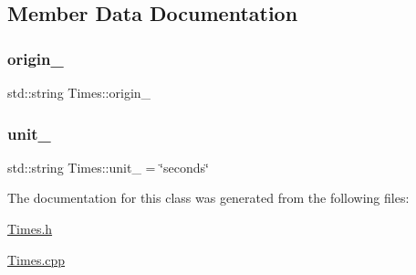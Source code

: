 \subsection{Member Data Documentation}
\mbox{\label{class_times_a7609195d9216105cad01df13230abfa9}} 
\subsubsection{\texorpdfstring{origin\+\_\+}{origin\_}}
{\footnotesize\ttfamily std\+::string Times\+::origin\+\_\+\hspace{0.3cm}{\ttfamily [protected]}}

\mbox{\label{class_times_a32130156e076d5511c44fc71ee68a980}} 
\subsubsection{\texorpdfstring{unit\+\_\+}{unit\_}}
{\footnotesize\ttfamily std\+::string Times\+::unit\+\_\+ = \char`\"{}seconds\char`\"{}\hspace{0.3cm}{\ttfamily [protected]}}



The documentation for this class was generated from the following files\+:\begin{DoxyCompactItemize}
\item 
\mbox{\hyperlink{_times_8h}{Times.\+h}}\item 
\mbox{\hyperlink{_times_8cpp}{Times.\+cpp}}\end{DoxyCompactItemize}
